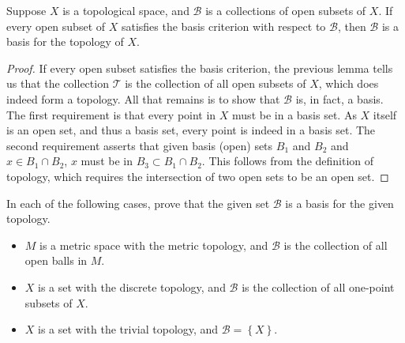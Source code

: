 \documentclass{mathnotes}
\begin{document}
\begin{lem}
    Suppose $X$ is a topological space, and $\mathcal{B}$ is a collections of open subsets of $X$. If every open subset of $X$ satisfies
    the basis criterion with respect to $\mathcal{B}$, then $\mathcal{B}$ is a basis for the topology of $X$.
\end{lem}

\begin{proof}
    If every open subset satisfies the basis criterion, the previous lemma tells us that the collection $\mathcal{T}$ is the collection
    of all open subsets of $X$, which does indeed form a topology. All that remains is to show that $\mathcal{B}$ is, in fact, a basis.
    The first requirement is that every point in $X$ must be in a basis set. As $X$ itself is an open set, and thus a basis set, every
    point is indeed in a basis set. The second requirement asserts that given basis (open) sets $B_1$ and $B_2$ and $x\in B_1\cap B_2$,
    $x$ must be in $B_3\subset B_1\cap B_2$. This follows from the definition of topology, which requires the intersection of two open
    sets to be an open set.
\end{proof}

\begin{exc}
    In each of the following cases, prove that the given set $\mathcal{B}$ is a basis for the given topology.
    \begin{itemize}
        \item $M$ is a metric space with the metric topology, and $\mathcal{B}$ is the collection of all open balls in $M$.
        \item $X$ is a set with the discrete topology, and $\mathcal{B}$ is the collection of all one-point subsets of $X$.
        \item $X$ is a set with the trivial topology, and $\mathcal{B}=\left\{ X \right\}$.
    \end{itemize}
\end{exc}
\end{document}
